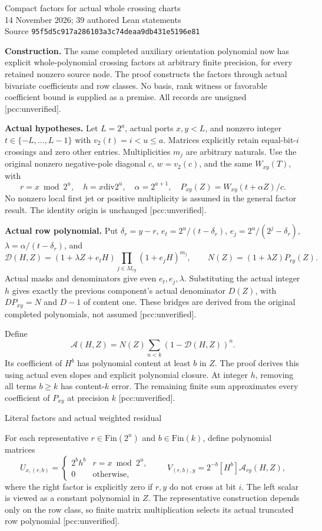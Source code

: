 \documentclass[10pt]{article}
\begin{document}
\begin{center}
{\Large Compact factors for actual whole crossing charts}\\[4pt]
14 November 2026; 39 authored Lean statements\\
Source \texttt{95f5d5c917a286103a3c74deaa9db431e5196e81}
\end{center}
\textbf{Construction.} The same completed auxiliary orientation polynomial
now has explicit whole-polynomial crossing factors at arbitrary finite
precision, for every retained nonzero source node. The proof constructs the
factors through actual bivariate coefficients and row classes. No basis,
rank witness or favorable coefficient bound is supplied as a premise.
All records are unsigned [pcc:unverified].

\textbf{Actual hypotheses.} Let $L=2^a$, actual ports $x,y<L$, and nonzero
integer $t\in\{-L,\ldots,L-1\}$ with $v_2(t)=i<u\le a$. Matrices explicitly
retain equal-bit-$i$ crossings and zero other entries. Multiplicities $m_j$
are arbitrary naturals. Use the original nonzero negative-pole diagonal $c$,
$w=v_2(c)$, and the same $W_{xy}(T)$, with
\[
 r=x\bmod2^u,\quad h=x\mathbin{\mathrm{div}}2^u,\quad
 \alpha=2^{a+1},\quad P_{xy}(Z)=W_{xy}(t+\alpha Z)/c.
\]
No nonzero local first jet or positive multiplicity is assumed in the general
factor result. The identity origin is unchanged [pcc:unverified].

\textbf{Actual row polynomial.} Put $\delta_r=y-r$,
$e_t=2^u/(t-\delta_r)$, $e_j=2^u/(2^j-\delta_r)$,
$\lambda=\alpha/(t-\delta_r)$, and
\[
 \mathcal D(H,Z)=(1+\lambda Z+e_tH)
      \prod_{j\in M_{ry}}(1+e_jH)^{m_j},\qquad
 N(Z)=(1+\lambda Z)P_{ry}(Z).
\]
Actual masks and denominators give even $e_t,e_j,\lambda$. Substituting the
actual integer $h$ gives exactly the previous component's actual denominator
$D(Z)$, with $DP_{xy}=N$ and $D-1$ of content one. These bridges are derived
from the original completed polynomials, not assumed [pcc:unverified].

Define
\[
 \mathcal A(H,Z)=N(Z)\sum_{n<k}(1-\mathcal D(H,Z))^n.
\]
Its coefficient of $H^b$ has polynomial content at least $b$ in $Z$.
The proof derives this using actual even slopes and explicit polynomial
closure. At integer $h$, removing all terms $b\ge k$ has content-$k$ error.
The remaining finite sum approximates every coefficient of $P_{xy}$ at
precision $k$ [pcc:unverified].

\newpage
\begin{center}{\Large Literal factors and actual weighted residual}\end{center}
For each representative $r\in\mathrm{Fin}(2^u)$ and $b\in\mathrm{Fin}(k)$,
define polynomial matrices
\[
 U_{x,(r,b)}=\begin{cases}2^b h^b&r=x\bmod2^u,\\0&\text{otherwise},\end{cases}
 \qquad
 V_{(r,b),y}=2^{-b}[H^b]\mathcal A_{ry}(H,Z),
\]
where the right factor is explicitly zero if $r,y$ do not cross at bit $i$.
The left scalar is viewed as a constant polynomial in $Z$.
The representative construction depends only on the row class, so finite
matrix multiplication selects its actual truncated row polynomial
[pcc:unverified].
\end{document}
